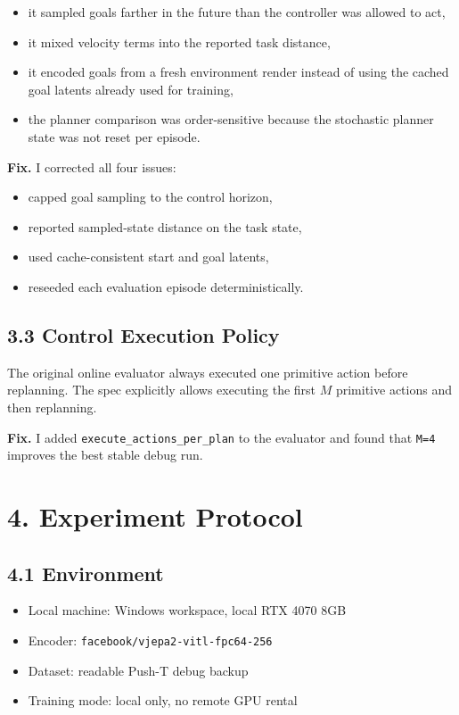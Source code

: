 \documentclass[11pt]{article}
\begin{document}
\begin{itemize}
\item it sampled goals farther in the future than the controller was allowed to act,
\item it mixed velocity terms into the reported task distance,
\item it encoded goals from a fresh environment render instead of using the cached goal latents already used for training,
\item the planner comparison was order-sensitive because the stochastic planner state was not reset per episode.
\end{itemize}

\textbf{Fix.}
I corrected all four issues:

\begin{itemize}
\item capped goal sampling to the control horizon,
\item reported sampled-state distance on the task state,
\item used cache-consistent start and goal latents,
\item reseeded each evaluation episode deterministically.
\end{itemize}

\subsection*{3.3 Control Execution Policy}

The original online evaluator always executed one primitive action before replanning.
The spec explicitly allows executing the first \(M\) primitive actions and then replanning.

\textbf{Fix.}
I added \texttt{execute\_actions\_per\_plan} to the evaluator and found that \texttt{M=4} improves the best stable debug run.

\section*{4. Experiment Protocol}

\subsection*{4.1 Environment}

\begin{itemize}
\item Local machine: Windows workspace, local RTX 4070 8GB
\item Encoder: \texttt{facebook/vjepa2-vitl-fpc64-256}
\item Dataset: readable Push-T debug backup
\item Training mode: local only, no remote GPU rental
\end{itemize}
\end{document}
